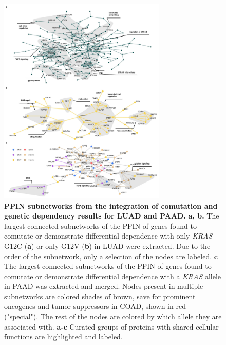 \documentclass[english, 10pt, letterpaper]{article}
\newcommand{\KRAS}{\emph{KRAS}}
\begin{document}
\begin{figure}[p]
\centering
\includegraphics[height=100mm]{figures/Supp_Fig_8.jpeg}
\caption{
    \textbf{PPIN subnetworks from the integration of comutation and genetic dependency results for LUAD and PAAD.}
    \textbf{a, b.} The largest connected subnetworks of the PPIN of genes found to comutate or demonstrate differential dependence with only \KRAS{} G12C (\textbf{a}) or only G12V (\textbf{b}) in LUAD were extracted. Due to the order of the subnetwork, only a selection of the nodes are labeled.
    \textbf{c} The largest connected subnetworks of the PPIN of genes found to comutate or demonstrate differential dependence with a \KRAS{} allele in PAAD was extracted and merged. Nodes present in multiple subnetworks are colored shades of brown, save for prominent oncogenes and tumor suppressors in COAD, shown in red ("special"). The rest of the nodes are colored by which allele they are associated with. 
    \textbf{a-c} Curated groups of proteins with shared cellular functions are highlighted and labeled.
}
\label{sfig:luadpaad-integrated-ppin}
\end{figure}

\end{document}
